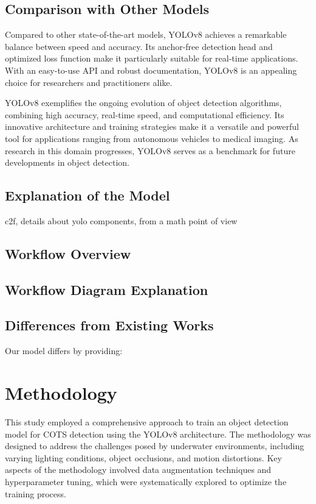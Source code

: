 \documentclass[conference]{IEEEtran}
\begin{document}
\subsection{Comparison with Other Models}
Compared to other state-of-the-art models, YOLOv8 achieves a remarkable balance between speed and accuracy. Its anchor-free detection head and optimized loss function make it particularly suitable for real-time applications. With an easy-to-use API and robust documentation, YOLOv8 is an appealing choice for researchers and practitioners alike.

YOLOv8 exemplifies the ongoing evolution of object detection algorithms, combining high accuracy, real-time speed, and computational efficiency. Its innovative architecture and training strategies make it a versatile and powerful tool for applications ranging from autonomous vehicles to medical imaging. As research in this domain progresses, YOLOv8 serves as a benchmark for future developments in object detection.
\subsection{Explanation of the Model}
c2f, details about yolo components, from a math point of view

\subsection{Workflow Overview}


\subsection{Workflow Diagram Explanation}


\subsection{Differences from Existing Works}
Our model differs by providing:



\section{Methodology}

This study employed a comprehensive approach to train an object detection model for COTS detection using the YOLOv8 architecture. The methodology was designed to address the challenges posed by underwater environments, including varying lighting conditions, object occlusions, and motion distortions. Key aspects of the methodology involved data augmentation techniques and hyperparameter tuning, which were systematically explored to optimize the training process.
\end{document}
